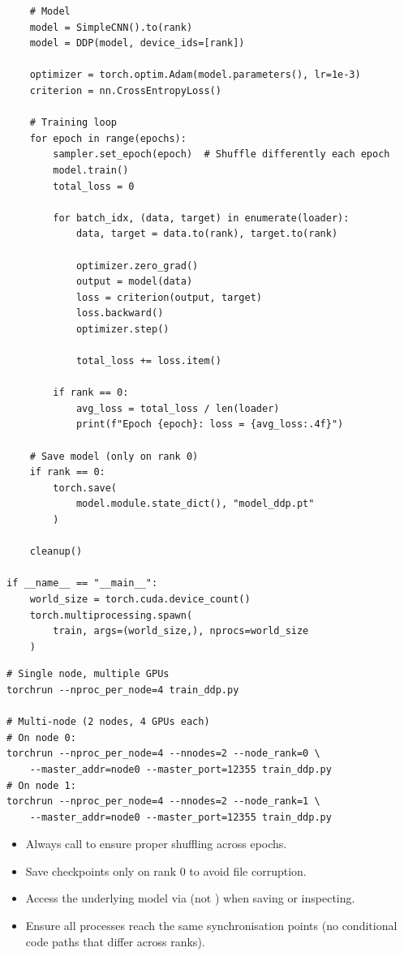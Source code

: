 \begin{codeblock}[title=\textbf{Complete PyTorch DDP training script}]
\begin{verbatim}
    # Model
    model = SimpleCNN().to(rank)
    model = DDP(model, device_ids=[rank])

    optimizer = torch.optim.Adam(model.parameters(), lr=1e-3)
    criterion = nn.CrossEntropyLoss()

    # Training loop
    for epoch in range(epochs):
        sampler.set_epoch(epoch)  # Shuffle differently each epoch
        model.train()
        total_loss = 0

        for batch_idx, (data, target) in enumerate(loader):
            data, target = data.to(rank), target.to(rank)

            optimizer.zero_grad()
            output = model(data)
            loss = criterion(output, target)
            loss.backward()
            optimizer.step()

            total_loss += loss.item()

        if rank == 0:
            avg_loss = total_loss / len(loader)
            print(f"Epoch {epoch}: loss = {avg_loss:.4f}")

    # Save model (only on rank 0)
    if rank == 0:
        torch.save(
            model.module.state_dict(), "model_ddp.pt"
        )

    cleanup()

if __name__ == "__main__":
    world_size = torch.cuda.device_count()
    torch.multiprocessing.spawn(
        train, args=(world_size,), nprocs=world_size
    )
\end{verbatim}
\end{codeblock}

\begin{codeblock}[title=\textbf{Launching DDP training}]
\begin{verbatim}
# Single node, multiple GPUs
torchrun --nproc_per_node=4 train_ddp.py

# Multi-node (2 nodes, 4 GPUs each)
# On node 0:
torchrun --nproc_per_node=4 --nnodes=2 --node_rank=0 \
    --master_addr=node0 --master_port=12355 train_ddp.py
# On node 1:
torchrun --nproc_per_node=4 --nnodes=2 --node_rank=1 \
    --master_addr=node0 --master_port=12355 train_ddp.py
\end{verbatim}
\end{codeblock}

\begin{warning}[title=\textbf{DDP pitfalls}]
\begin{itemize}
  \item Always call  to ensure proper
    shuffling across epochs.
  \item Save checkpoints only on rank 0 to avoid file corruption.
  \item Access the underlying model via  (not
    \cli{model}) when saving or inspecting.
  \item Ensure all processes reach the same synchronisation points
    (no conditional code paths that differ across ranks).
\end{itemize}
\end{warning}

